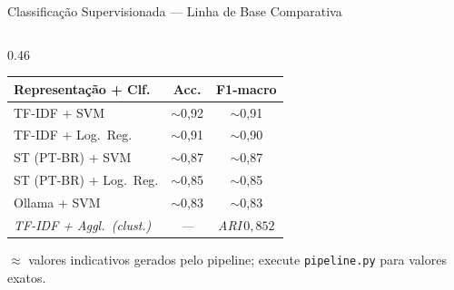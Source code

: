 \documentclass[aspectratio=169]{beamer}
\begin{document}
\begin{frame}{Classificação Supervisionada — Linha de Base Comparativa}
\begin{columns}[T]
\begin{column}{0.46\textwidth}
      {\footnotesize
      \setlength{\tabcolsep}{3pt}
      \renewcommand{\arraystretch}{1.15}
      \begin{tabular}{lcc}
        \toprule
        \textbf{Representação + Clf.} & \textbf{Acc.} & \textbf{F1-macro}\\
        \midrule
        \rowcolor{warnyellow!20}
        TF-IDF + SVM             & $\sim$0{,}92 & $\sim$0{,}91\\
        TF-IDF + Log.\ Reg.      & $\sim$0{,}91 & $\sim$0{,}90\\
        ST (PT-BR) + SVM         & $\sim$0{,}87 & $\sim$0{,}87\\
        ST (PT-BR) + Log.\ Reg.  & $\sim$0{,}85 & $\sim$0{,}85\\
        Ollama + SVM             & $\sim$0{,}83 & $\sim$0{,}83\\
        \midrule
        \rowcolor{positivegreen!15}
        \emph{TF-IDF + Aggl.\ (clust.)} & \emph{—} & \emph{ARI\,$0{,}852$}\\
        \bottomrule
      \end{tabular}
      }
      \vspace{0.3em}
      {\tiny $\approx$ valores indicativos gerados pelo pipeline; execute \texttt{pipeline.py} para valores exatos.}
    \end{column}
  \end{columns}
\end{frame}
\end{document}
